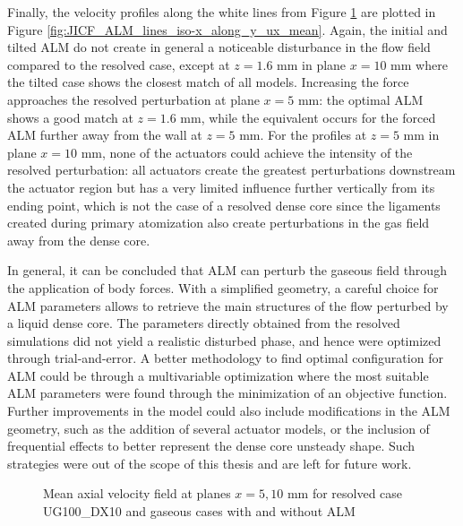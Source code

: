 Finally, the velocity profiles along the white lines from Figure \ref{fig:ALM_gas_fields_plane_x} are plotted in Figure \ref{fig:JICF_ALM_lines_iso-x_along_y_ux_mean}. Again, the initial and tilted ALM do not create in general a noticeable disturbance in the flow field compared to the resolved case, except at $z = 1.6$ mm in plane $x = 10$ mm where the tilted case shows the closest match of all models. Increasing the force approaches the resolved perturbation at plane $x = 5$ mm: the optimal ALM shows a good match at $z = 1.6$ mm, while the equivalent occurs for the forced ALM further away from the wall at $z = 5$ mm. For the profiles at $z = 5$ mm in plane $x = 10$ mm, none of the actuators could achieve the intensity of the resolved perturbation: all actuators create the greatest perturbations downstream the actuator region but has a very limited influence further vertically from its ending point, which is not the case of a resolved dense core since the ligaments created during primary atomization also create perturbations in the gas field away from the dense core. 


In general, it can be concluded that ALM can perturb the gaseous field through the application of body forces. With a simplified geometry, a careful choice for ALM parameters allows to retrieve the main structures of the flow perturbed by a liquid dense core. The parameters directly obtained from the resolved simulations did not yield a realistic disturbed phase, and hence were optimized through trial-and-error. A better methodology to find optimal configuration for ALM could be through a multivariable optimization where the most suitable ALM parameters were found through the minimization of an objective function. Further improvements in the model could also include modifications in the ALM geometry, such as the addition of several actuator models, or the inclusion of frequential effects to better represent the dense core unsteady shape. Such strategies were out of the scope of this thesis and are left for future work. 

\clearpage


\begin{figure}[h!]	
	\centering	{}
	\caption{Mean axial velocity field at planes $x = 5, 10$ mm for resolved case UG100\_DX10 and gaseous cases with and without ALM}
	\label{fig:ALM_gas_fields_plane_x}
\end{figure}




